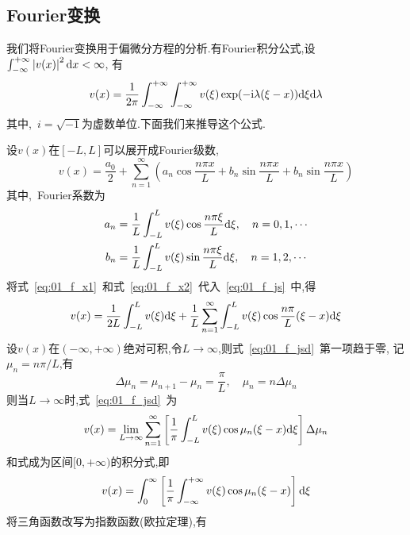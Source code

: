 \subsection{Fourier变换}
我们将Fourier变换用于偏微分方程的分析.有Fourier积分公式,设$\int_{-\infty}^{+\infty}\left|v(x)\right|^2\mathrm{d} x<\infty$,
有
\begin{equation}\label{eq:01_f}
 v(x)=\dfrac{1}{2\pi}\int_{-\infty}^{+\infty}\int_{-\infty}^{+\infty} v(\xi)\exp(-\mathrm{i}\lambda(\xi-x))
 \mathrm{d}\xi\mathrm{d}\lambda
\end{equation}
其中,~$i=\sqrt{-1}$为虚数单位.下面我们来推导这个公式.\par
设$v(x)$在$[-L,L]$可以展开成Fourier级数,
\begin{equation}\label{eq:01_f_js}
 v(x)=\dfrac{a_0}{2}+\sum_{n=1}^{\infty}\left(a_n\cos\dfrac{n\pi x}{L}+
 b_n\sin\dfrac{n\pi x}{L}+b_n\sin\dfrac{n\pi x}{L}\right)
\end{equation}
其中,~Fourier系数为
\begin{align}
 a_n &=\dfrac{1}{L}\int_{-L}^{L} v(\xi)\cos\dfrac{n\pi\xi}{L}\mathrm{d} \xi,\quad n=0,1,\cdots \label{eq:01_f_x1}\\
 b_n &=\dfrac{1}{L}\int_{-L}^{L} v(\xi)\sin\dfrac{n\pi\xi}{L}\mathrm{d} \xi,\quad n=1,2,\cdots \label{eq:01_f_x2}
\end{align}
将式~\eqref{eq:01_f_x1}~和式~\eqref{eq:01_f_x2}~代入~\eqref{eq:01_f_js}~中,得
\begin{equation}\label{eq:01_f_jsd}
 v(x)=\dfrac{1}{2L}\int_{-L}^{L} v(\xi)\mathrm{d} \xi + \dfrac{1}{L}\sum_{n=1}^{\infty}
      \int_{-L}^{L} v(\xi)\cos\dfrac{n\pi}{L}(\xi-x)\mathrm{d}\xi
\end{equation}
设$v(x)$在$(-\infty,+\infty)$绝对可积,令$L\to\infty$,则式~\eqref{eq:01_f_jsd}~第一项趋于零,
记$\mu_n=n\pi/L$,有
\begin{equation}
 \Delta\mu_n = \mu_{n+1}-\mu_n =\dfrac{\pi}{L},\quad \mu_n=n\Delta\mu_n
\end{equation}
则当$L\rightarrow\infty$时,式~\eqref{eq:01_f_jsd}~为
\begin{equation*}
 v(x)=\lim_{L\to\infty}\sum_{n=1}^{\infty}\left[\dfrac{1}{\pi}\int_{-L}^{L}
      v(\xi)\cos\mu_n(\xi-x)\mathrm{d}\xi\right]\Delta\mu_n
\end{equation*}
和式成为区间$[0,+\infty)$的积分式,即
\begin{equation}\label{eq:01_f_jfs}
 v(x)=\int_0^{\infty}\left[\dfrac{1}{\pi}\int_{-\infty}^{+\infty} v(\xi)\cos\mu_n(\xi-x)\right]\mathrm{d}\xi
\end{equation}
将三角函数改写为指数函数(欧拉定理),有
